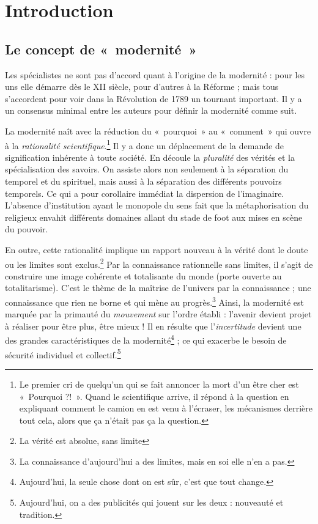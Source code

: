 \documentclass[12pt]{report}
\begin{document}
\begin{titlepage}

\end{titlepage}




\chapter*{Introduction}

\section*{Le concept de «~modernité~»}

Les spécialistes ne sont pas d’accord quant à l’origine de la modernité : pour les uns elle démarre dès le XII siècle, pour d’autres à la Réforme ; mais tous s’accordent pour voir dans la Révolution de 1789 un tournant important. Il y a un consensus minimal entre les auteurs pour définir la modernité comme suit.

La modernité naît avec la réduction du «~pourquoi~» au «~comment~» qui ouvre à la \emph{rationalité scientifique}.\footnote{Le premier cri de quelqu'un qui se fait annoncer la mort d'un être cher est «~Pourquoi ?!~». Quand le scientifique arrive, il répond à la question en expliquant comment le camion en est venu à l'écraser, les mécanismes derrière tout cela, alors que ça n'était pas ça la question.} Il y a donc un déplacement de la demande de signification inhérente à toute société. En découle la \emph{pluralité} des vérités et la spécialisation des savoirs. On assiste alors non seulement à la séparation du temporel et du spirituel, mais aussi à la séparation des différents pouvoirs temporels. Ce qui a pour corollaire immédiat la dispersion de l’imaginaire. L’absence d’institution ayant le monopole du sens fait que la métaphorisation du religieux envahit différents domaines allant du stade de foot aux mises en scène du pouvoir.

En outre, cette rationalité implique un rapport nouveau à la vérité dont le doute ou les limites sont exclus.\footnote{La vérité est absolue, sans limite} Par la connaissance rationnelle sans limites, il s’agit de construire une image cohérente et totalisante du monde (porte ouverte au totalitarisme). C’est le thème de la maîtrise de l’univers par la connaissance ; une connaissance que rien ne borne et qui mène au progrès.\footnote{La connaissance d'aujourd'hui a des limites, mais en soi elle n'en a pas.} Ainsi, la modernité est marquée par la primauté du \emph{mouvement} sur l’ordre établi : l’avenir devient projet à réaliser pour être plus, être mieux ! Il en résulte que l’\emph{incertitude} devient une des grandes caractéristiques de la modernité\footnote{Aujourd'hui, la seule chose dont on est sûr, c'est que tout change.} ; ce qui exacerbe le besoin de sécurité individuel et collectif.\footnote{Aujourd'hui, on a des publicités qui jouent sur les deux : nouveauté et tradition.}
\end{document}
